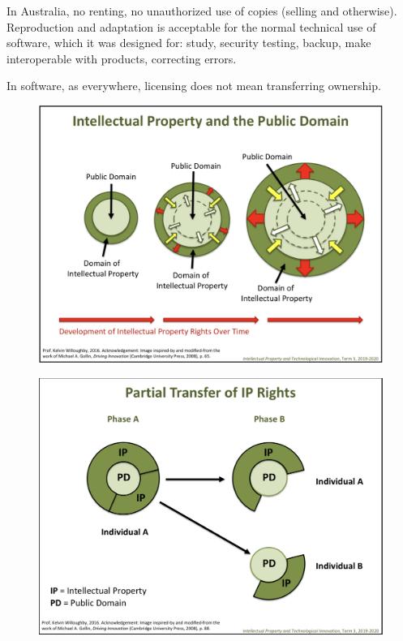 \documentclass[10pt,a4paper,twocolumn]{article}
\begin{document}
In Australia, no renting, no unauthorized use of copies (selling and otherwise). Reproduction
and adaptation is acceptable for the normal technical use of software, which it was designed
for: study, security testing, backup, make interoperable with products, correcting errors.

In software, as everywhere, licensing does not mean transferring ownership.

\begin{figure}
  \centering
  \includegraphics[width=\columnwidth]{ip_and_pb.png}
\end{figure}
\begin{figure}
  \centering
  \includegraphics[width=\columnwidth]{ip_partial.png}
\end{figure}
\end{document}
